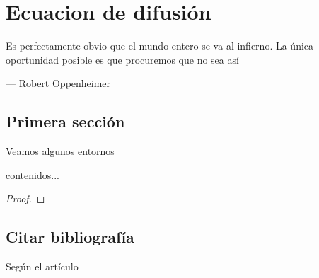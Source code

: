 {\justifying
	\chapter{Ecuacion de difusión}
	\epigraph{Es perfectamente obvio que el mundo entero se va al
		infierno. La única oportunidad posible es que procuremos que
		no sea así}{--- \textup{Robert Oppenheimer}}
	\begin{abstract}
		\lipsum[1-2]
	\end{abstract}
	\section{Primera sección}
	Veamos algunos entornos
	\begin{definition}{}{}
		contenidos...
	\end{definition}
	\begin{lemma}{}{}
		\lipsum[1]
	\end{lemma}
	\begin{theorem}{}{}
		\lipsum[1]
	\end{theorem}
	\begin{corollary}{}{}
		\lipsum[1]
	\end{corollary}
	\begin{example}{}{}
		\lipsum[1]
	\end{example}
	\begin{proof}
		\lipsum
	\end{proof}
	\section{Citar bibliografía}
	Según el artículo \cite{bib:exampleReference}
	\putbib %
}
\cleanalldata